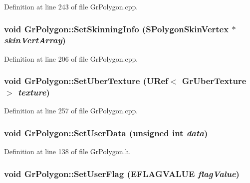 \begin{CompactItemize}
Definition at line 243 of file GrPolygon.cpp.\hypertarget{class_gr_polygon_f46dd08b01dfa7b086ef3c3ec2531d9c}{
\subsubsection[{SetSkinningInfo}]{\setlength{\rightskip}{0pt plus 5cm}void GrPolygon::SetSkinningInfo ({\bf SPolygonSkinVertex} $\ast$ {\em skinVertArray})}}
\label{class_gr_polygon_f46dd08b01dfa7b086ef3c3ec2531d9c}




Definition at line 206 of file GrPolygon.cpp.\hypertarget{class_gr_polygon_3b23c179792f596d818ecd94491c45a4}{
\subsubsection[{SetUberTexture}]{\setlength{\rightskip}{0pt plus 5cm}void GrPolygon::SetUberTexture ({\bf URef}$<$ {\bf GrUberTexture} $>$ {\em texture})}}
\label{class_gr_polygon_3b23c179792f596d818ecd94491c45a4}




Definition at line 257 of file GrPolygon.cpp.\hypertarget{class_gr_polygon_7d5c9c2b213b88aead8530e6ef720ff7}{
\subsubsection[{SetUserData}]{\setlength{\rightskip}{0pt plus 5cm}void GrPolygon::SetUserData (unsigned int {\em data})}}
\label{class_gr_polygon_7d5c9c2b213b88aead8530e6ef720ff7}




Definition at line 138 of file GrPolygon.h.\hypertarget{class_gr_polygon_9347a0c308ea32417e30a5d5ca3fa333}{
\subsubsection[{SetUserFlag}]{\setlength{\rightskip}{0pt plus 5cm}void GrPolygon::SetUserFlag ({\bf EFLAGVALUE} {\em flagValue})}}
\label{class_gr_polygon_9347a0c308ea32417e30a5d5ca3fa333}





\end{CompactItemize}
